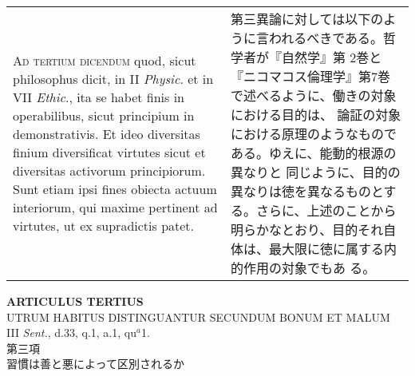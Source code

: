 \documentclass[10pt]{jsarticle}
\begin{document}
\begin{longtable}{p{21em}p{21em}}
\\

{\scshape Ad tertium dicendum} quod, sicut philosophus dicit, in II
{\itshape Physic}. et in VII {\itshape Ethic}., ita se habet finis in
operabilibus, sicut principium in demonstrativis. Et ideo diversitas
finium diversificat virtutes sicut et diversitas activorum
principiorum. Sunt etiam ipsi fines obiecta actuum interiorum, qui
maxime pertinent ad virtutes, ut ex supradictis patet.

&

第三異論に対しては以下のように言われるべきである。哲学者が『自然学』第
2巻と『ニコマコス倫理学』第7巻で述べるように、働きの対象における目的は、
論証の対象における原理のようなものである。ゆえに、能動的根源の異なりと
同じように、目的の異なりは徳を異なるものとする。さらに、上述のことから
明らかなとおり、目的それ自体は、最大限に徳に属する内的作用の対象でもあ
る。

\end{longtable}
\newpage

\begin{center}
{\Large {\bf ARTICULUS TERTIUS}}\\
{\large UTRUM HABITUS DISTINGUANTUR SECUNDUM BONUM ET MALUM}\\
{\footnotesize III {\itshape Sent.}, d.33, q.1, a.1, qu$^{a}$1.}\\
{\Large 第三項\\習慣は善と悪によって区別されるか}
\end{center}
\end{document}
